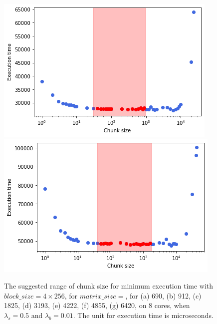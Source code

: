 \begin{figure}[H]
{		\label{fig57:d}}\hfill
	{\centering\includegraphics[scale=.4]{images/hpx_for_loop/blazemark/chunk_sizes/marvin_chunk_4855_8_10_500_30_960.png}	
		\label{fig57:f}}
	{\centering\includegraphics[scale=.4]{images/hpx_for_loop/blazemark/chunk_sizes/marvin_chunk_6420_8_10_500_40_1737.png}	
		\label{fig57:g}}
	\caption{The suggested range of chunk size for minimum execution time with $block\_{size}=4\times{256}$, for $matrix\_size=$, for (a) 690, (b) 912, (c) 1825, (d) 3193, (e) 4222, (f) 4855, (g) 6420, on 8 cores, when $\lambda_{s}=0.5$ and $\lambda_{b}=0.01$. The unit for execution time is microseconds.}
	\label{fig57}	
\end{figure}


